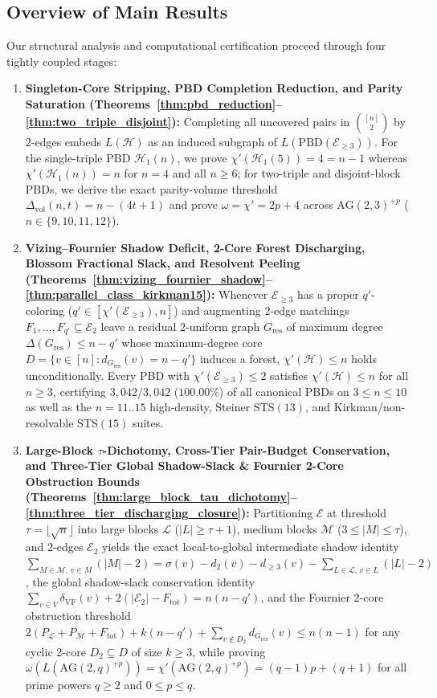 \documentclass[11pt,reqno]{amsart}
\theoremstyle{definition}
\theoremstyle{remark}
\begin{document}
\subsection*{Overview of Main Results}
Our structural analysis and computational certification proceed through four tightly coupled stages:
\begin{enumerate}
  \item \textbf{Singleton-Core Stripping, PBD Completion Reduction, and Parity Saturation (Theorems~\ref{thm:pbd_reduction}--\ref{thm:two_triple_disjoint}):} Completing all uncovered pairs in $\binom{[n]}{2}$ by $2$-edges embeds $L(\mathcal{H})$ as an induced subgraph of $L(\mathrm{PBD}(\mathcal{E}_{\ge 3}))$. For the single-triple PBD $\mathcal{H}_1(n)$, we prove $\chi'(\mathcal{H}_1(5)) = 4 = n - 1$ whereas $\chi'(\mathcal{H}_1(n)) = n$ for $n = 4$ and all $n \ge 6$; for two-triple and disjoint-block PBDs, we derive the exact parity-volume threshold $\Delta_{\mathrm{vol}}(n, t) = n - (4t + 1)$ and prove $\omega = \chi' = 2p + 4$ across $\mathrm{AG}(2,3)^{+p}$ ($n \in \{9, 10, 11, 12\}$).
  \item \textbf{Vizing--Fournier Shadow Deficit, 2-Core Forest Discharging, Blossom Fractional Slack, and Resolvent Peeling (Theorems~\ref{thm:vizing_fournier_shadow}--\ref{thm:parallel_class_kirkman15}):} Whenever $\mathcal{E}_{\ge 3}$ has a proper $q'$-coloring ($q' \in [\chi'(\mathcal{E}_{\ge 3}), n]$) and augmenting $2$-edge matchings $F_1, \dots, F_{q'} \subseteq \mathcal{E}_2$ leave a residual $2$-uniform graph $G_{\mathrm{res}}$ of maximum degree $\Delta(G_{\mathrm{res}}) \le n - q'$ whose maximum-degree core $D = \{v \in [n] : d_{G_{\mathrm{res}}}(v) = n - q'\}$ induces a forest, $\chi'(\mathcal{H}) \le n$ holds unconditionally. Every PBD with $\chi'(\mathcal{E}_{\ge 3}) \le 2$ satisfies $\chi'(\mathcal{H}) \le n$ for all $n \ge 3$, certifying $3{,}042 / 3{,}042$ ($100.00\%$) of all canonical PBDs on $3 \le n \le 10$ as well as the $n = 11..15$ high-density, Steiner $\mathrm{STS}(13)$, and Kirkman/non-resolvable $\mathrm{STS}(15)$ suites.
  \item \textbf{Large-Block $\tau$-Dichotomy, Cross-Tier Pair-Budget Conservation, and Three-Tier Global Shadow-Slack \& Fournier 2-Core Obstruction Bounds (Theorems~\ref{thm:large_block_tau_dichotomy}--\ref{thm:three_tier_discharging_closure}):} Partitioning $\mathcal{E}$ at threshold $\tau = \lfloor\sqrt{n}\rfloor$ into large blocks $\mathcal{L}$ ($|L| \ge \tau + 1$), medium blocks $\mathcal{M}$ ($3 \le |M| \le \tau$), and $2$-edges $\mathcal{E}_2$ yields the exact local-to-global intermediate shadow identity $\sum_{M \in \mathcal{M},\, v \in M}(|M| - 2) = \sigma(v) - d_2(v) - d_{\ge 3}(v) - \sum_{L \in \mathcal{L},\, v \in L}(|L| - 2)$, the global shadow-slack conservation identity $\sum_{v \in V}\delta_{\mathrm{VF}}(v) + 2(|\mathcal{E}_2| - F_{\mathrm{tot}}) = n(n - q')$, and the Fournier 2-core obstruction threshold $2(P_{\mathcal{L}} + P_{\mathcal{M}} + F_{\mathrm{tot}}) + k(n - q') + \sum_{v \notin D_2} d_{G_{\mathrm{res}}}(v) \le n(n - 1)$ for any cyclic 2-core $D_2 \subseteq D$ of size $k \ge 3$, while proving $\omega(L(\mathrm{AG}(2,q)^{+p})) = \chi'(\mathrm{AG}(2,q)^{+p}) = (q - 1)p + (q + 1)$ for all prime powers $q \ge 2$ and $0 \le p \le q$.

\end{enumerate}
\end{document}

